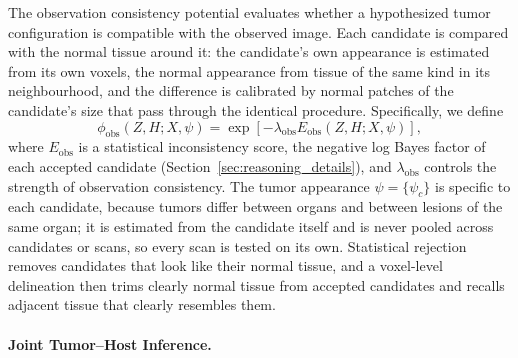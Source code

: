 \documentclass[fleqn,10pt]{olplainarticle}
\begin{document}
The observation consistency potential
evaluates whether a hypothesized tumor
configuration is compatible with the
observed image. Each candidate is compared with the normal tissue around it: the candidate's own appearance is
estimated from its own voxels, the normal appearance from tissue of the same kind in its neighbourhood, and the
difference is calibrated by normal patches of the candidate's size that pass through the identical procedure.
Specifically, we define
\begin{equation}
\label{eq:observation_potential}
\phi_{\mathrm{obs}}(Z,H;X,\psi)
=
\exp\left[
-\lambda_{\mathrm{obs}}
E_{\mathrm{obs}}(Z,H;X,\psi)
\right],
\end{equation}
where $E_{\mathrm{obs}}$ is a
statistical inconsistency score, the negative log Bayes factor of each accepted candidate
(Section~\ref{sec:reasoning_details}), and
$\lambda_{\mathrm{obs}}$ controls the
strength of observation consistency.
The tumor appearance $\psi=\{\psi_c\}$ is specific to each candidate, because tumors differ between organs and between
lesions of the same organ; it is estimated from the candidate itself and is never pooled across candidates or scans,
so every scan is tested on its own. Statistical rejection removes candidates that look like their normal tissue, and a
voxel-level delineation then trims clearly normal tissue from accepted candidates and recalls adjacent tissue that
clearly resembles them.

\paragraph{Joint Tumor--Host Inference.}
\end{document}
